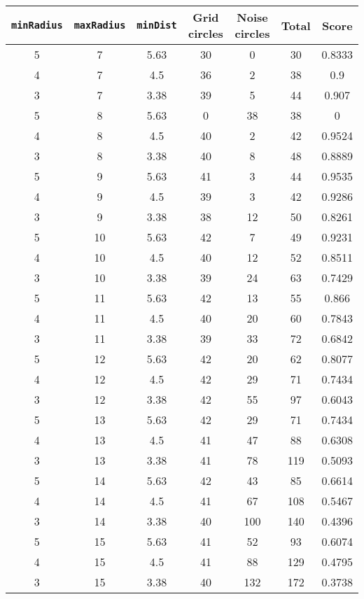 \documentclass[letterpaper, 12pt]{article}
\begin{document}
\begin{longtable}{|c|c|c|c|c|c|c|}
\hline
\textbf{\texttt{minRadius}} & \textbf{\texttt{maxRadius}} & \textbf{\texttt{minDist}} & \textbf{Grid circles} & \textbf{Noise circles} & \textbf{Total} & \textbf{Score} \\
\hline
5 & 7 & 5.63 & 30 & 0 & 30 & 0.8333 \\
\hline
4 & 7 & 4.5 & 36 & 2 & 38 & 0.9 \\
\hline
3 & 7 & 3.38 & 39 & 5 & 44 & 0.907 \\
\hline
5 & 8 & 5.63 & 0 & 38 & 38 & 0 \\
\hline
4 & 8 & 4.5 & 40 & 2 & 42 & 0.9524 \\
\hline
3 & 8 & 3.38 & 40 & 8 & 48 & 0.8889 \\
\hline
5 & 9 & 5.63 & 41 & 3 & 44 & 0.9535 \\
\hline
4 & 9 & 4.5 & 39 & 3 & 42 & 0.9286 \\
\hline
3 & 9 & 3.38 & 38 & 12 & 50 & 0.8261 \\
\hline
5 & 10 & 5.63 & 42 & 7 & 49 & 0.9231 \\
\hline
4 & 10 & 4.5 & 40 & 12 & 52 & 0.8511 \\
\hline
3 & 10 & 3.38 & 39 & 24 & 63 & 0.7429 \\
\hline
5 & 11 & 5.63 & 42 & 13 & 55 & 0.866 \\
\hline
4 & 11 & 4.5 & 40 & 20 & 60 & 0.7843 \\
\hline
3 & 11 & 3.38 & 39 & 33 & 72 & 0.6842 \\
\hline
5 & 12 & 5.63 & 42 & 20 & 62 & 0.8077 \\
\hline
4 & 12 & 4.5 & 42 & 29 & 71 & 0.7434 \\
\hline
3 & 12 & 3.38 & 42 & 55 & 97 & 0.6043 \\
\hline
5 & 13 & 5.63 & 42 & 29 & 71 & 0.7434 \\
\hline
4 & 13 & 4.5 & 41 & 47 & 88 & 0.6308 \\
\hline
3 & 13 & 3.38 & 41 & 78 & 119 & 0.5093 \\
\hline
5 & 14 & 5.63 & 42 & 43 & 85 & 0.6614 \\
\hline
4 & 14 & 4.5 & 41 & 67 & 108 & 0.5467 \\
\hline
3 & 14 & 3.38 & 40 & 100 & 140 & 0.4396 \\
\hline
5 & 15 & 5.63 & 41 & 52 & 93 & 0.6074 \\
\hline
4 & 15 & 4.5 & 41 & 88 & 129 & 0.4795 \\
\hline
3 & 15 & 3.38 & 40 & 132 & 172 & 0.3738 \\

\end{longtable}
\end{document}
